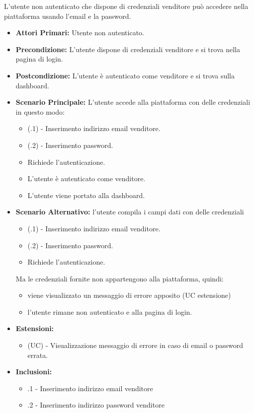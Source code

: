 L'utente non autenticato che dispone di credenziali venditore può accedere nella piattaforma usando l'email e la password.
\begin{itemize}
    \item \textbf{Attori Primari:} Utente non autenticato.
    \item \textbf{Precondizione:} L'utente dispone di credenziali venditore e si trova nella pagina di login.
    \item \textbf{Postcondizione:} L'utente è autenticato come venditore e si trova sulla dashboard.
    \item \textbf{Scenario Principale:} L'utente accede alla piattaforma con delle credenziali in questo modo:
    \begin{itemize}
        \item (\actualUC.1) - Inserimento indirizzo email venditore.
        \item (\actualUC.2) - Inserimento password.
        \item Richiede l'autenticazione.
        \item L'utente è autenticato come venditore.
        \item L'utente viene portato alla dashboard.
    \end{itemize}
	\item \textbf{Scenario Alternativo:} l'utente compila i campi dati con delle credenziali 
	\begin{itemize}
		\item (\actualUC.1) - Inserimento indirizzo email venditore.
		\item (\actualUC.2) - Inserimento password.
        \item Richiede l'autenticazione.
    \end{itemize}
	Ma le credenziali fornite non appartengono alla piattaforma, quindi:
	\begin{itemize}
		\item viene visualizzato un messaggio di errore apposito (UC estensione)
		\item l'utente rimane non autenticato e alla pagina di login.
	\end{itemize}
    \item \textbf{Estensioni:}
    \begin{itemize}
        \item (UC) - Visualizzazione messaggio di errore in caso di email o password errata.
    \end{itemize}
    \item \textbf{Inclusioni:}
    \begin{itemize}
    	\item \actualUC.1 - Inserimento indirizzo email venditore
    	\item \actualUC.2 - Inserimento indirizzo password venditore
    \end{itemize}
\end{itemize}

